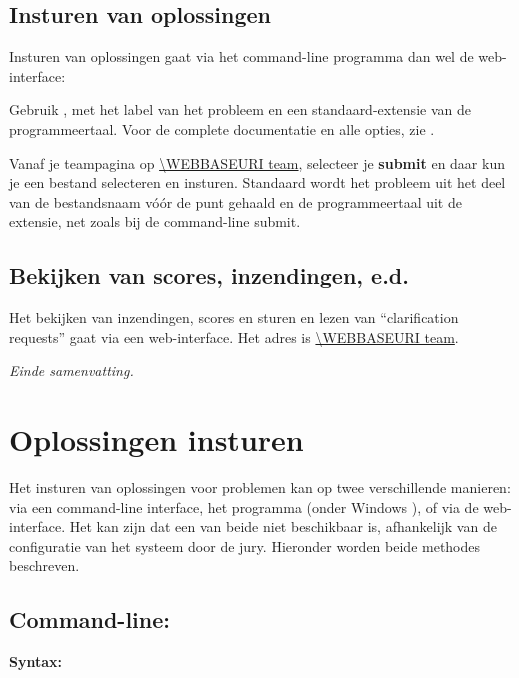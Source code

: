 \subsection{Insturen van oplossingen}

Insturen van oplossingen gaat via het command-line programma
 dan wel de web-interface:
\begin{description}[\breaklabel\setlabelstyle{\bfseries}]
\item[Command-line] 
Gebruik , met  het
label van het probleem en  een standaard-extensie van
de programmeertaal. Voor de complete documentatie en alle opties, zie .
\item[Web-Interface]
Vanaf je teampagina op \url{\WEBBASEURI team}, selecteer je
\textbf{submit} en daar kun je een bestand selecteren en insturen.
Standaard wordt het probleem uit het deel van de bestandsnaam v\'o\'or de
punt gehaald en de programmeertaal uit de extensie, net zoals bij de
command-line submit.
\end{description}

\subsection{Bekijken van scores, inzendingen, e.d.}

Het bekijken van inzendingen, scores en sturen en lezen van
``clarification requests'' gaat via een web-interface. Het adres is
\url{\WEBBASEURI team}.

\emph{Einde samenvatting.}

\newpage
\section{Oplossingen insturen}\label{submit}

Het insturen van oplossingen voor problemen kan op twee verschillende
manieren: via een command-line interface, het programma 
(onder Windows ), of via de web-interface. Het kan
zijn dat een van beide niet beschikbaar is, afhankelijk van de
configuratie van het systeem door de jury. Hieronder worden beide
methodes beschreven.

\subsection{Command-line: }

\textbf{Syntax:} 


